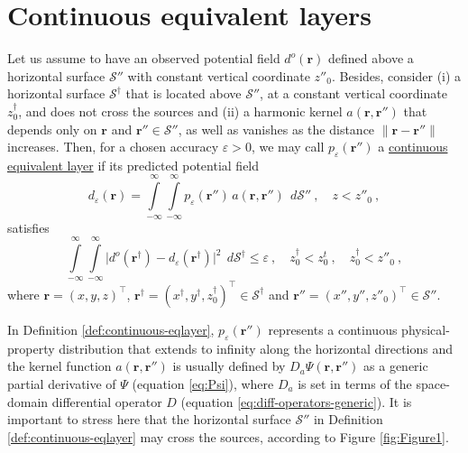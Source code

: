 \section{Continuous equivalent layers}
\label{sec:continuous_eqlayer}

\begin{definition}
	Let us assume to have an observed potential field $d^{o}(\mathbf{r})$ defined above 
	a horizontal surface $\mathcal{S}''$ with constant vertical coordinate $z''_{0}$. 
	Besides, consider (i) a horizontal surface $\mathcal{S}^{\dagger}$ that is located above 
	$\mathcal{S}''$, at a constant vertical coordinate $z^{\dagger}_{0}$, 
	and does not cross the sources and (ii) a harmonic kernel 
	$a(\mathbf{r}, \mathbf{r}'')$ that depends only on $\mathbf{r}$ and $\mathbf{r}'' \in \mathcal{S}''$, as well as 
	vanishes as the distance $\| \mathbf{r} - \mathbf{r}'' \|$ increases. 
	Then, for a chosen accuracy $\varepsilon > 0$, we may call $p_{\varepsilon}(\mathbf{r}'')$ 
	a \underline{continuous equivalent layer} if its predicted potential field 
	\begin{equation}
		d_{\varepsilon}(\mathbf{r})
		= \int\limits_{-\infty}^{\infty}\int\limits_{-\infty}^{\infty}
		p_{\varepsilon}(\mathbf{r}'') \, a(\mathbf{r}, \mathbf{r}'') \:\: d\mathcal{S}''
		\: , \quad z < z''_{0} \: ,
		\label{eq:predicted-data-continuous-layer}
	\end{equation}
	satisfies 
	\begin{equation}
		\int\limits_{-\infty}^{\infty} \int\limits_{-\infty}^{\infty}
		\vert d^{o}(\mathbf{r}^{\dagger}) - 
		d_{\varepsilon}(\mathbf{r}^{\dagger}) \vert^{2}
		\:\: d\mathcal{S}^{\dagger} \le \varepsilon \: ,
		\quad z^{\dagger}_{0} < z^{t}_{0} \: , \quad z^{\dagger}_{0} < z''_{0} \: ,
		\label{eq:epsilon-bound-data}
	\end{equation}
	where $\mathbf{r} = (x, y, z)^{\top}$, 
	$\mathbf{r}^{\dagger} = (x^{\dagger}, y^{\dagger}, z^{\dagger}_{0})^{\top} \in \mathcal{S}^{\dagger}$ 
	and $\mathbf{r}'' = (x'', y'', z''_{0})^{\top} \in \mathcal{S}''$.
	\label{def:continuous-eqlayer}
\end{definition}

In Definition \ref{def:continuous-eqlayer}, $p_{\varepsilon}(\mathbf{r}'')$ represents a continuous 
physical-property distribution that extends to infinity along the horizontal directions and 
the kernel function $a(\mathbf{r}, \mathbf{r}'')$ is usually defined by $D_{a} \Psi(\mathbf{r}, \mathbf{r}'')$ 
as a generic partial derivative of $\Psi$ (equation \ref{eq:Psi}),
where $D_{a}$ is set in terms of the space-domain differential operator 
$D$ (equation \ref{eq:diff-operators-generic}).
It is important to stress here that the horizontal surface $\mathcal{S}''$ in Definition \ref{def:continuous-eqlayer} 
may cross the sources, according to Figure \ref{fig:Figure1}.

